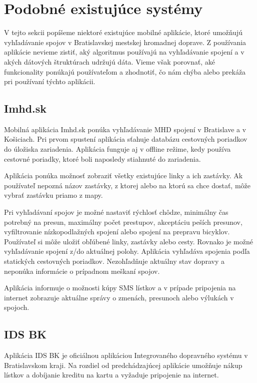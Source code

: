 \section{Podobné existujúce systémy}
\label{sec:applications}
V tejto sekcii popíšeme niektoré existujúce mobilné aplikácie, ktoré umožňujú vyhľadávanie spojov v Bratislavskej mestskej hromadnej doprave. Z používania aplikácie nevieme zistiť, aký algoritmus používajú na vyhľadávanie spojení a v akých dátových štruktúrach udržujú dáta. Vieme však porovnať, aké funkcionality ponúkajú používateľom a zhodnotiť, čo nám chýba alebo prekáža pri používaní týchto aplikácii.

\subsection{Imhd.sk}
Mobilná aplikácia Imhd.sk ponúka vyhľadávanie MHD spojení v Bratislave a v Košiciach. Pri prvom spustení aplikácia sťahuje databázu cestovných poriadkov do úložiska zariadenia. Aplikácia funguje aj v offline režime, kedy používa cestovné poriadky, ktoré boli naposledy stiahnuté do zariadenia. 

Aplikácia ponúka možnosť zobraziť všetky existujúce linky a ich zastávky. Ak používateľ nepozná názov zastávky, z ktorej alebo na ktorú sa chce dostať, môže vybrať zastávku priamo z mapy. 

Pri vyhľadávaní spojov je možné nastaviť rýchlosť chôdze, minimálny čas potrebný na presun, maximálny počet prestupov, akceptáciu peších presunov, vyfiltrovanie nízkopodlažných spojení alebo spojení na prepravu bicyklov. Používateľ si môže uložiť obľúbené linky, zastávky alebo cesty. Rovnako je možné vyhľadávanie spojení z/do aktuálnej polohy. Aplikácia vyhľadáva spojenia podľa statických cestovných poriadkov. Nezohľadňuje aktuálny stav dopravy a neponúka informácie o prípadnom meškaní spojov.

Aplikácia informuje o možnosti kúpy SMS lístkov a v prípade pripojenia na internet zobrazuje aktuálne správy o zmenách, presunoch alebo výlukách v spojoch.  

\subsection{IDS BK}
Aplikácia IDS BK je oficiálnou aplikáciou Integrovaného dopravného systému v Bratislavskom kraji. Na rozdiel od predchádzajúcej aplikácie umožňuje nákup lístkov a dobíjanie kreditu na kartu a vyžaduje pripojenie na internet.

